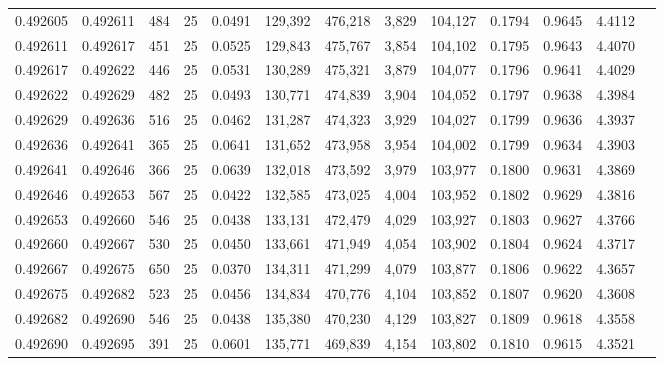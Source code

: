 \begin{tabular}{rrrrrrrrrrrrr}
0.492605 & 0.492611 &   484 &  25 &                                     0.0491 & 129,392 & 476,218 &   3,829 & 104,127 & 0.1794 & 0.9645 & 4.4112 \\
0.492611 & 0.492617 &   451 &  25 &                                     0.0525 & 129,843 & 475,767 &   3,854 & 104,102 & 0.1795 & 0.9643 & 4.4070 \\
0.492617 & 0.492622 &   446 &  25 &                                     0.0531 & 130,289 & 475,321 &   3,879 & 104,077 & 0.1796 & 0.9641 & 4.4029 \\
0.492622 & 0.492629 &   482 &  25 &                                     0.0493 & 130,771 & 474,839 &   3,904 & 104,052 & 0.1797 & 0.9638 & 4.3984 \\
0.492629 & 0.492636 &   516 &  25 &                                     0.0462 & 131,287 & 474,323 &   3,929 & 104,027 & 0.1799 & 0.9636 & 4.3937 \\
0.492636 & 0.492641 &   365 &  25 &                                     0.0641 & 131,652 & 473,958 &   3,954 & 104,002 & 0.1799 & 0.9634 & 4.3903 \\
0.492641 & 0.492646 &   366 &  25 &                                     0.0639 & 132,018 & 473,592 &   3,979 & 103,977 & 0.1800 & 0.9631 & 4.3869 \\
0.492646 & 0.492653 &   567 &  25 &                                     0.0422 & 132,585 & 473,025 &   4,004 & 103,952 & 0.1802 & 0.9629 & 4.3816 \\
0.492653 & 0.492660 &   546 &  25 &                                     0.0438 & 133,131 & 472,479 &   4,029 & 103,927 & 0.1803 & 0.9627 & 4.3766 \\
0.492660 & 0.492667 &   530 &  25 &                                     0.0450 & 133,661 & 471,949 &   4,054 & 103,902 & 0.1804 & 0.9624 & 4.3717 \\
0.492667 & 0.492675 &   650 &  25 &                                     0.0370 & 134,311 & 471,299 &   4,079 & 103,877 & 0.1806 & 0.9622 & 4.3657 \\
0.492675 & 0.492682 &   523 &  25 &                                     0.0456 & 134,834 & 470,776 &   4,104 & 103,852 & 0.1807 & 0.9620 & 4.3608 \\
0.492682 & 0.492690 &   546 &  25 &                                     0.0438 & 135,380 & 470,230 &   4,129 & 103,827 & 0.1809 & 0.9618 & 4.3558 \\
0.492690 & 0.492695 &   391 &  25 &                                     0.0601 & 135,771 & 469,839 &   4,154 & 103,802 & 0.1810 & 0.9615 & 4.3521 \\

\end{tabular}
